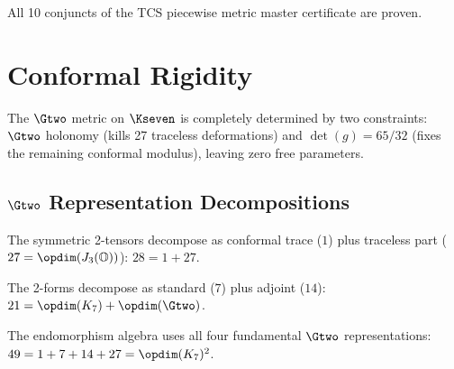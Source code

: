 \begin{theorem}\label{thm:tcs_piecewise_cert}
    \leanok
    All 10 conjuncts of the TCS piecewise metric master certificate are proven.
\end{theorem}


\chapter{Conformal Rigidity}\label{chap:conformal_rigidity}

The $\Gtwo$ metric on $\Kseven$ is completely determined by two constraints:
$\Gtwo$ holonomy (kills 27 traceless deformations) and $\det(g) = 65/32$
(fixes the remaining conformal modulus), leaving zero free parameters.

\section{\texorpdfstring{$\Gtwo$}{G2} Representation Decompositions}

\begin{theorem}[$\mathrm{Sym}^2(V_7) = 1 \oplus 27$ under $\Gtwo$]\label{thm:sym2_decomp}
    \leanok
    The symmetric 2-tensors decompose as conformal trace ($1$)
    plus traceless part ($27 = \opdim(J_3(\mathbb{O}))$):
    $28 = 1 + 27$.
\end{theorem}

\begin{theorem}[$\Lambda^2(V_7) = 7 \oplus 14$ under $\Gtwo$]\label{thm:skew2_decomp}
    \leanok
    The 2-forms decompose as standard ($7$) plus adjoint ($14$):
    $21 = \opdim(K_7) + \opdim(\Gtwo)$.
\end{theorem}

\begin{theorem}[$\mathrm{End}(V_7) = 1 \oplus 7 \oplus 14 \oplus 27$]\label{thm:end_decomp}
    \leanok
    The endomorphism algebra uses all four fundamental $\Gtwo$ representations:
    $49 = 1 + 7 + 14 + 27 = \opdim(K_7)^2$.
\end{theorem}

